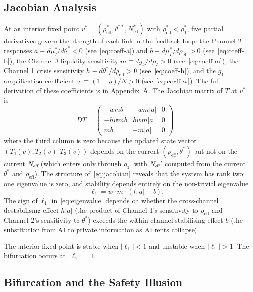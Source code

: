 \subsection{Jacobian Analysis}

At an interior fixed point $v^* = (\rho_{\text{eff}}^*, \theta^{**}, N_{\text{eff}}^*)$ with $\rho_{\text{eff}}^* < \rho_1^*$, five partial derivatives govern the strength of each link in the feedback loop: the Channel 2 responses $a \equiv d\mu_I^*/d\theta^* < 0$ (see~\eqref{eq:coeff-a}) and $b \equiv d\mu_I^*/d\rho_{\text{eff}} > 0$ (see~\eqref{eq:coeff-b}), the Channel 3 liquidity sensitivity $m \equiv dg_3/d\mu_I > 0$ (see~\eqref{eq:coeff-m}), the Channel 1 crisis sensitivity $h \equiv d\theta^*/d\rho_{\text{eff}} > 0$ (see~\eqref{eq:coeff-h}), and the $g_1$ amplification coefficient $w \equiv (1-\rho)/N > 0$ (see~\eqref{eq:coeff-w}). The full derivation of these coefficients is in Appendix~A. The Jacobian matrix of $T$ at $v^*$ is
\begin{equation}\label{eq:jacobian}
  DT = \begin{pmatrix} -wmb & -wm|a| & 0 \\ -hwmb & hwm|a| & 0 \\ mb & -m|a| & 0 \end{pmatrix},
\end{equation}
where the third column is zero because the updated state vector $(T_1(v), T_2(v), T_3(v))$ depends on the current $(\rho_{\text{eff}}, \theta^*)$ but not on the current $N_{\text{eff}}$ (which enters only through $g_1$, with $N_{\text{eff}}'$ computed from the current $\theta^*$ and $\rho_{\text{eff}}$). The structure of~\eqref{eq:jacobian} reveals that the system has rank two: one eigenvalue is zero, and stability depends entirely on the non-trivial eigenvalue
\begin{equation}\label{eq:eigenvalue}
  \ell_1 = w \cdot m \cdot (h|a| - b).
\end{equation}
The sign of $\ell_1$ in~\eqref{eq:eigenvalue} depends on whether the cross-channel destabilising effect $h|a|$ (the product of Channel 1's sensitivity to $\rho_{\text{eff}}$ and Channel 2's sensitivity to $\theta^*$) exceeds the within-channel stabilising effect $b$ (the substitution from AI to private information as AI rents collapse).

The interior fixed point is stable when $|\ell_1| < 1$ and unstable when $|\ell_1| > 1$. The bifurcation occurs at $|\ell_1| = 1$.

\subsection{Bifurcation and the Safety Illusion}

